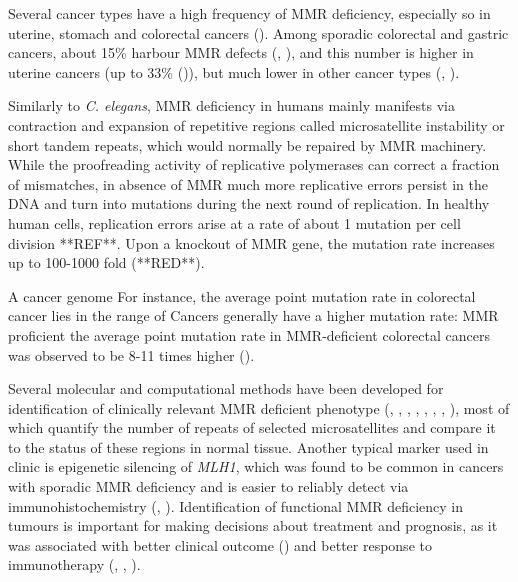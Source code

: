Several cancer types have a high frequency of MMR deficiency, especially so in uterine, stomach and 
colorectal cancers (\cite{Cortes-Ciriano2017-rh}). Among sporadic colorectal and gastric cancers, about 15\% 
harbour MMR defects (\cite{Funkhouser2012-uq}, \cite{Cancer_Genome_Atlas_Research_Network2014-af}), and this number is higher in uterine 
cancers (up to 33\% (\cite{Hecht2006-rs})), but much lower in other cancer types (\cite{Cortes-Ciriano2017-rh}, \cite{Bonneville2017-ge}). 

Similarly to \textit{C. elegans}, MMR deficiency in humans mainly manifests via contraction and expansion
of repetitive regions called microsatellite instability or short tandem repeats, which would normally 
be repaired by MMR machinery.
While the proofreading activity of replicative polymerases can correct a fraction of mismatches, 
in absence of MMR much more replicative errors persist in the DNA and turn into mutations during the next round of replication. In healthy human cells, replication errors arise at a rate of about 1 mutation per cell division **REF**. Upon a knockout of MMR gene, the mutation rate increases up to 100-1000 fold (**RED**).

A cancer genome 
For instance, the average point mutation rate in colorectal cancer lies in the range of Cancers generally have a higher mutation rate: MMR proficient  the average point mutation 
rate in MMR-deficient colorectal cancers was observed to be 8-11 times higher (\cite{Tomasetti2015-yn}).  

Several molecular and computational methods have been developed for identification of clinically relevant
MMR deficient phenotype (\cite{Boland1998-ma}, \cite{Buhard2006-fp}, \cite{Laghi2008-yq}, \cite{Cortes-Ciriano2017-rh}, \cite{Niu2014-pt}, \cite{Bonneville2017-ge}, \cite{Huang2015-al}, \cite{Nowak2017-vo}), 
most of which quantify the number of repeats of selected microsatellites and compare it to the status of these regions in normal tissue. 
Another typical marker used in clinic is epigenetic silencing of \textit{MLH1}, which was found to be common
in cancers with sporadic MMR deficiency and is easier to reliably detect via immunohistochemistry (\cite{Herman1998-cc},
\cite{Boissiere-Michot2016-uv}). Identification of functional MMR deficiency in tumours is
important for making decisions about treatment and prognosis, as it was 
associated with better clinical outcome (\cite{Lee2002-pu}) and better response to immunotherapy 
(\cite{Dudley2016-bm}, \cite{Le2015-fb}, \cite{Kelderman2015-xv}).

